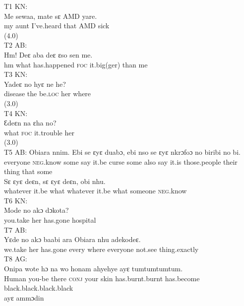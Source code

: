 \documentclass[output=paper,colorlinks,citecolor=brown]{langscibook}
\begin{document}
\ea\label{ex:obeng:1}%
    T1 KN:\\
    \gll    Me sewaa, mate sɛ AMD yare.\\
            my aunt I’ve.heard that AMD sick \\
            (4.0)\\
\ex\label{ex:obeng:2}
    T2 AB:\\
    \gll    Hm! Deɛ aba deɛ ɛso sen me.\\
            hm what has.happened \textsc{foc} it.big(ger) than me\\
\ex\label{ex:obeng:3}
    T3 KN:\\
    \gll    Yadeɛ no hyɛ ne he?\\
            disease the be.\textsc{loc} her where\\
            (3.0) \\
\ex\label{ex:obeng:4}
    T4 KN:\\
    \gll    Ɛdeɛn na ɛha no?\\
            what \textsc{foc} it.trouble her\\
            (3.0)\\
\ex\label{ex:obeng:5}
    T5 AB:
    \ea
    \gll    Obiara nnim. Ebi se ɛyɛ duabɔ, ebi nso se ɛyɛ nkrɔfoɔ no biribi no bi.\\ 
            everyone \textsc{neg}.know some say it.be curse some also say it.is those.people their thing that some\\
    \ex
    \gll    Sɛ ɛyɛ deɛn, sɛ ɛyɛ deɛn, obi nhu.\\
            whatever it.be what whatever it.be what someone \textsc{neg}.know\\
    \z
\ex\label{ex:obeng:6}
    T6 KN:\\
    \gll    Mode no akɔ dɔkota?\\
            you.take her has.gone hospital \\
\ex\label{ex:obeng:7}
    T7 AB:\\
    \gll    Yɛde no akɔ baabi ara Obiara nhu adekodeɛ.\\
            we.take her has.gone every where everyone not.see thing.exactly\\
\ex\label{ex:obeng:8}
    T8 AG:\\
    \ea
    \gll    Onipa wote hɔ na wo honam ahyehye ayɛ tumtumtumtum.\\
            Human you-be there \textsc{conj} your skin has.burnt.burnt has.become black.black.black.black \\
    \ex
    \gll    ayɛ ammɔdin \\
\end{document}
